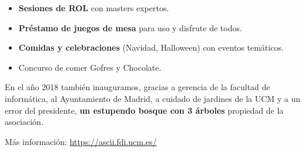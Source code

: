 \begin{multicols}{2}
\begin{itemize}
    \item \textbf{Sesiones de ROL} con masters expertos.
    \item \textbf{Préstamo de juegos de mesa} para uso y disfrute de todos.
    \item \textbf{Comidas y celebraciones} (Navidad, Halloween) con eventos temáticos.
    \item Concurso de comer Gofres y Chocolate.
\end{itemize}
\noindent
En el año 2018 también inauguramos, gracias a gerencia de la facultad de informática, al Ayuntamiento de Madrid, a cuidado de jardines de la UCM y a un error del presidente, \textbf{un estupendo bosque con 3 árboles} propiedad de la asociación.
\end{multicols}

\vfill
Más información: \url{https://ascii.fdi.ucm.es/}